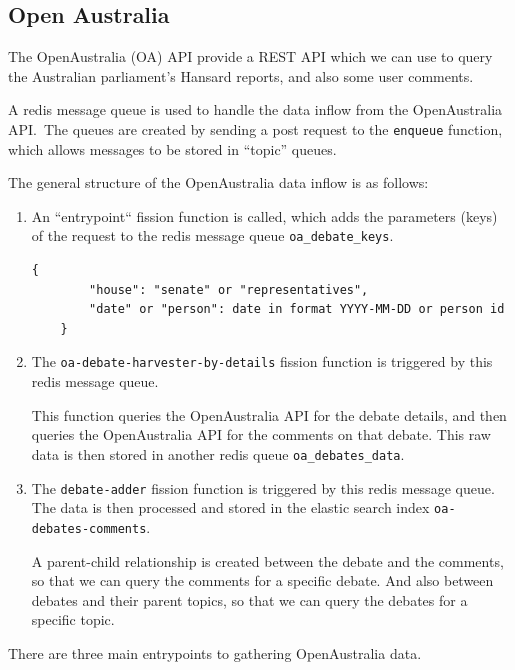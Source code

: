 \documentclass[]{article}
\numberwithin{equation}{section}
\begin{document}
\subsection*{Open Australia}

The OpenAustralia (OA) API provide a REST API which we can use to query the Australian parliament's Hansard reports, and also some user comments.

A redis message queue is used to handle the data inflow from the OpenAustralia API.\
The queues are created by sending a post request to the \texttt{enqueue} function, which allows messages to be stored in ``topic'' queues. 

The general structure of the OpenAustralia data inflow is as follows:
\begin{enumerate}
    \item An ``entrypoint`` fission function is called, which adds the parameters (keys) of the request to the redis message queue \texttt{oa\_debate\_keys}.
    
    \begin{lstlisting}[frame=none,numbers=none]
    { 
        "house": "senate" or "representatives",
        "date" or "person": date in format YYYY-MM-DD or person id
    }
    \end{lstlisting}


    \item The \texttt{oa-debate-harvester-by-details} fission function is triggered by this redis message queue. 
    
    This function queries the OpenAustralia API for the debate details, and then queries the OpenAustralia API for the comments on that debate. This raw data is then stored in another redis queue \texttt{oa\_debates\_data}.
    \item The \texttt{debate-adder} fission function is triggered by this redis message queue. 
    The data is then processed and stored in the elastic search index \texttt{oa-debates-comments}.
    
    A parent-child relationship is created between the debate and the comments, so that we can query the comments for a specific debate.
    And also between debates and their parent topics, so that we can query the debates for a specific topic.
\end{enumerate}

There are three main entrypoints to gathering OpenAustralia data.
\end{document}
